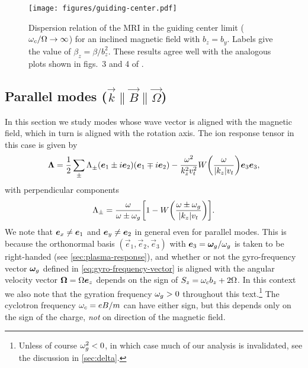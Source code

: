 \documentclass[aps,pre,notitlepage,amsmath,amssymb,amsfonts,nobibnotes,nofootinbib,superscriptaddress]{revtex4-1}
\begin{document}
\begin{figure}
  \centering\texttt{[image: figures/guiding-center.pdf]}
  \caption{Dispersion relation of the MRI in the guiding center limit
    ($\omega_c/\Omega\to\infty$) for an inclined magnetic field with $b_z=b_y$.
    Labels give the value of $\beta_z=\beta/b_z^2$. These results agree well
    with the analogous plots shown in figs.~3 and 4 of
    \citet{Quataert2002}.}\label{fig:guiding-center}
\end{figure}

\subsection{Parallel modes
  ($\vec{k}\bm{\parallel}\vec{B}\bm{\parallel}\vec{\Omega}$)}
\label{sec:par}

In this section we study modes whose wave vector is aligned with the magnetic
field, which in turn is aligned with the rotation axis. The ion response
tensor in this case is given by
\begin{equation}
  \label{eq:parallel-response}
  \mathbf{\Lambda} =
  \frac{1}{2}\sum_\pm\Lambda^{}_\pm
  (\vec{e}_1\pm i\vec{e}_2)(\vec{e}_1\mp i\vec{e}_2)
  - \frac{\omega^2}{k_z^2\vt^2} W\left(\frac{\omega}{|k_z|\vt}\right)
  \vec{e}_3\vec{e}_3,
\end{equation}
with perpendicular components
\begin{equation}
  \label{eq:circular-components}
  \Lambda_\pm = \frac{\omega}{\omega\pm\omg}
  \left[1 - W\left(\frac{\omega\pm\omg}{|k_z|\vt}\right)\right].
\end{equation}
We note that $\bm{e}_x\ne\bm{e}_1$ and $\bm{e}_y\ne\bm{e}_2$ in general even for
parallel modes. This is because the orthonormal basis
$(\vec{e}_1,\vec{e}_2,\vec{e}_3)$ with $\bm{e}_3=\bm{\omega}_g/\omega_g$ is taken to be
right-handed (see \cref{sec:plasma-response}), and whether or not the
gyro-frequency vector $\bm{\omega}_g$ defined in \cref{eq:gyro-frequency-vector} is
aligned with the angular velocity vector $\bm{\Omega}=\Omega\bm{e}_z$ depends on
the sign of $S_z=\omega_c{}b_z+2\Omega$. In this context we also note that the
gyration frequency $\omega_g>0$ throughout this text.\footnote{Unless of course
  $\omega_g^2<0$, in which case much of our analysis is invalidated, see the
  discussion in \cref{sec:delta}.} The cyclotron frequency $\omega_c=eB/m$ can
have either sign, but this depends only on the sign of the charge, \emph{not}
on direction of the magnetic field.
\end{document}
